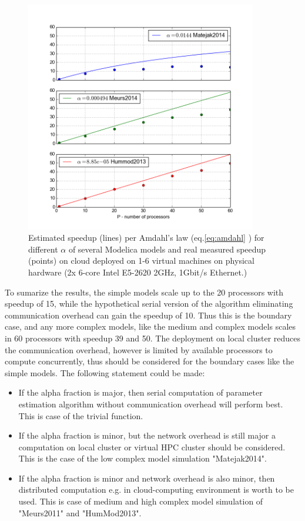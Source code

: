 \begin{figure}[htb]
    \centering
    \includegraphics[width=0.9\textwidth]{chapter7/speedup.png}
    \caption{Estimated speedup (lines) per Amdahl's law (eq.\ref{eq:amdahl} \cite{Amdahl1967}) for different $\alpha$ of several Modelica models and real measured speedup (points) on cloud deployed on 1-6 virtual machines on physical hardware (2x 6-core Intel E5-2620 2GHz, 1Gbit/s Ethernet.) }
    \label{fig:amdahlres}
\end{figure}

To sumarize the results, the simple models scale up to the 20 processors with speedup of 15, while the hypothetical serial version of the algorithm eliminating communication overhead can gain the speedup of 10. Thus this is the boundary case, and any more complex models, like the medium and complex models scales in 60 processors with speedup 39 and 50. The deployment on local cluster reduces the communication overhead, however is limited by available processors to compute concurrently, thus should be considered for the boundary cases like the simple models. The following statement could be made:
\begin{itemize}
\item{If the alpha fraction is major, then serial computation of parameter estimation algorithm without communication overhead will perform best. This is case of the trivial function. }
\item{If the alpha fraction is minor, but the network overhead is still major a computation on local cluster or virtual HPC cluster should be considered. This is the case of the low complex model simulation "Matejak2014"\cite{Matejak2014sj}.} 
\item{If the alpha fraction is minor and network overhead is also minor, then distributed computation e.g. in cloud-computing environment is worth to be used. This is case  of medium and high complex model simulation of "Meurs2011"\cite{Meurs2011} and "HumMod2013"\cite{Kofranek2011hummod}.}
\end{itemize}

